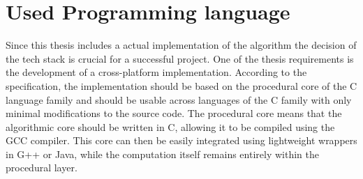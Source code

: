 \section{Used Programming language}
Since this thesis includes a actual implementation of the algorithm the decision of the tech stack is crucial for a successful project. One of the thesis requirements is the development of a cross-platform implementation. According to the specification, the implementation should be based on the procedural core of the C language family and should be usable across languages of the C family with only minimal modifications to the source code.
The procedural core means that the algorithmic core should be written in C, allowing it to be compiled using the GCC compiler. This core can then be easily integrated using lightweight wrappers in G++ or Java, while the computation itself remains entirely within the procedural layer.